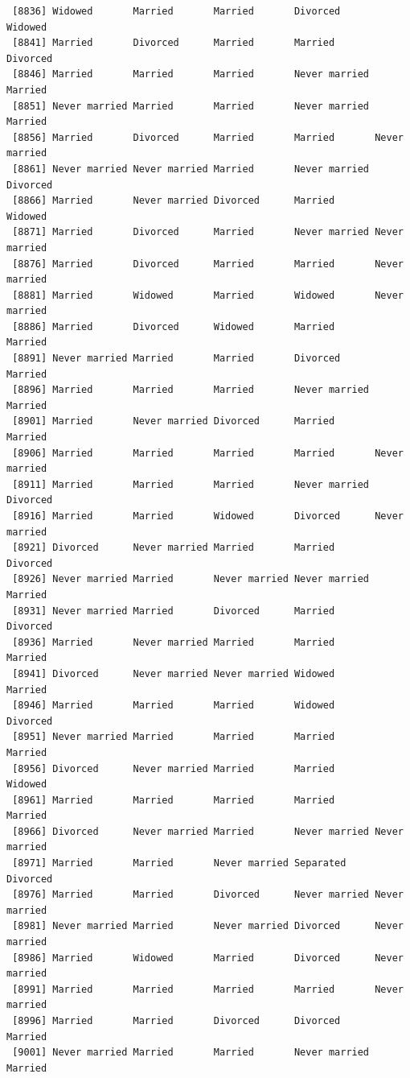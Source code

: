 \documentclass[
  letterpaper,
  DIV=11,
  numbers=noendperiod,
  oneside]{scrartcl}
\begin{document}
\begin{verbatim}
 [8836] Widowed       Married       Married       Divorced      Widowed      
 [8841] Married       Divorced      Married       Married       Divorced     
 [8846] Married       Married       Married       Never married Married      
 [8851] Never married Married       Married       Never married Married      
 [8856] Married       Divorced      Married       Married       Never married
 [8861] Never married Never married Married       Never married Divorced     
 [8866] Married       Never married Divorced      Married       Widowed      
 [8871] Married       Divorced      Married       Never married Never married
 [8876] Married       Divorced      Married       Married       Never married
 [8881] Married       Widowed       Married       Widowed       Never married
 [8886] Married       Divorced      Widowed       Married       Married      
 [8891] Never married Married       Married       Divorced      Married      
 [8896] Married       Married       Married       Never married Married      
 [8901] Married       Never married Divorced      Married       Married      
 [8906] Married       Married       Married       Married       Never married
 [8911] Married       Married       Married       Never married Divorced     
 [8916] Married       Married       Widowed       Divorced      Never married
 [8921] Divorced      Never married Married       Married       Divorced     
 [8926] Never married Married       Never married Never married Married      
 [8931] Never married Married       Divorced      Married       Divorced     
 [8936] Married       Never married Married       Married       Married      
 [8941] Divorced      Never married Never married Widowed       Married      
 [8946] Married       Married       Married       Widowed       Divorced     
 [8951] Never married Married       Married       Married       Married      
 [8956] Divorced      Never married Married       Married       Widowed      
 [8961] Married       Married       Married       Married       Married      
 [8966] Divorced      Never married Married       Never married Never married
 [8971] Married       Married       Never married Separated     Divorced     
 [8976] Married       Married       Divorced      Never married Never married
 [8981] Never married Married       Never married Divorced      Never married
 [8986] Married       Widowed       Married       Divorced      Never married
 [8991] Married       Married       Married       Married       Never married
 [8996] Married       Married       Divorced      Divorced      Married      
 [9001] Never married Married       Married       Never married Married      

\end{verbatim}
\end{document}
